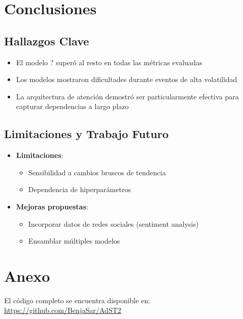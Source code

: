 \documentclass[12pt]{article}
\begin{document}

\newpage
\section{Conclusiones}
\label{sec:conclusiones}

\subsection{Hallazgos Clave}

\begin{itemize}
\item El modelo ? superó al resto en todas las métricas evaluadas %
\item Los modelos mostraron dificultades durante eventos de alta volatilidad
\item La arquitectura de atención demostró ser particularmente efectiva para capturar dependencias a largo plazo
\end{itemize}

\subsection{Limitaciones y Trabajo Futuro}

\begin{itemize}
\item \textbf{Limitaciones}:
\begin{itemize}
\item Sensibilidad a cambios bruscos de tendencia
\item Dependencia de hiperparámetros
\end{itemize}

\item \textbf{Mejoras propuestas}:
\begin{itemize}
\item Incorporar datos de redes sociales (sentiment analysis)
\item Ensamblar múltiples modelos
\end{itemize}
\end{itemize}


\newpage
\section*{Anexo}
El código completo se encuentra disponible en: \\
\url{https://github.com/BenjaSar/AdST2}
\end{document}
